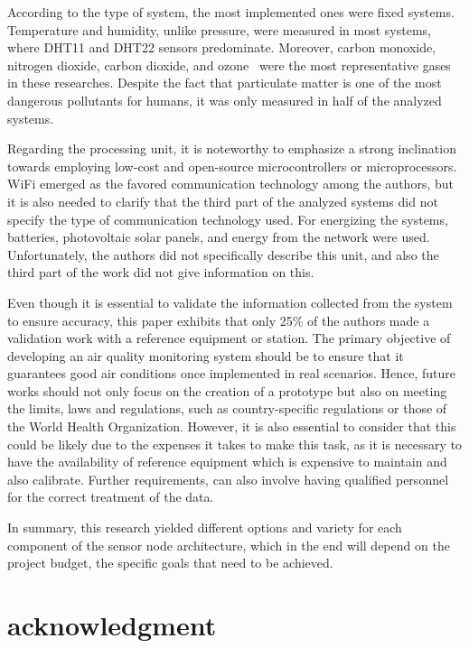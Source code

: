 \documentclass[10pt]{../style_src/imeko_acta}
\begin{document}
According to the type of system, the most implemented ones were fixed systems. 
Temperature and humidity, unlike pressure, were measured in most systems, where DHT11 and DHT22 sensors predominate. Moreover, carbon monoxide, nitrogen dioxide, carbon dioxide, and ozone~\cite{ozone} were the most representative gases in these researches. Despite the fact that particulate matter is one of the most dangerous pollutants for humans, it was only measured in half of the analyzed systems. 

Regarding the processing unit, it is noteworthy to emphasize a strong inclination towards employing low-cost and open-source microcontrollers or microprocessors. WiFi emerged as the favored communication technology among the authors, but it is also needed to clarify that the third part of the analyzed systems did not specify the type of communication technology used. For energizing the systems, batteries, photovoltaic solar panels, and energy from the network were used. Unfortunately, the authors did not specifically describe this unit, and also the third part of the work did not give information on this.

Even though it is essential to validate the information collected from the system to ensure accuracy, this paper exhibits that only 25\% of the authors made a validation work with a reference equipment or station. The primary objective of developing an air quality monitoring system should be to ensure that it guarantees good air conditions once implemented in real scenarios. Hence, future works should not only focus on the creation of a prototype but also on meeting the limits, laws and regulations, such as country-specific regulations or those of the World Health Organization. However, it is also essential to consider that this could be likely due to the expenses it takes to make this task, as it is necessary to have the availability of reference equipment which is expensive to maintain and also calibrate. Further requirements, can also involve having qualified personnel for the correct treatment of the data.

In summary, this research yielded different options and variety for each component of the sensor node architecture, which in the end will depend on the project budget, the specific goals that need to be achieved.


\section*{acknowledgment} 
\end{document}
